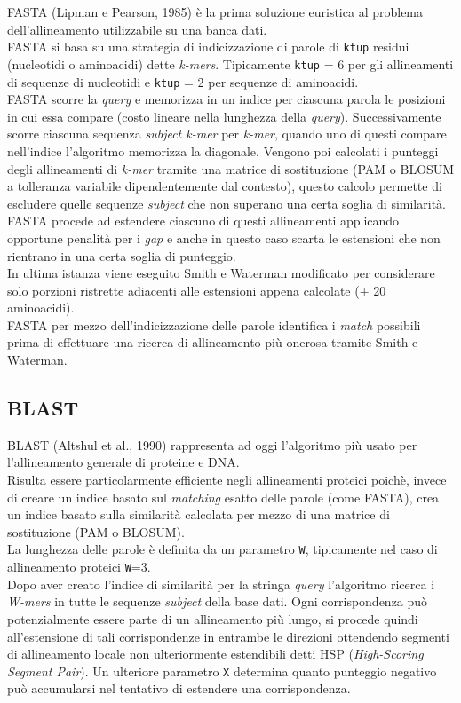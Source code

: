 \documentclass[conference]{IEEEtran}
\begin{document}
FASTA (Lipman e Pearson, 1985) è la prima soluzione euristica al problema dell'allineamento utilizzabile su una banca dati.\\
FASTA si basa su una strategia di indicizzazione di parole di \texttt{ktup} residui (nucleotidi o aminoacidi) dette \textit{k-mers}.
Tipicamente \texttt{ktup} = 6 per gli allineamenti di sequenze di nucleotidi e \texttt{ktup} = 2 per sequenze di aminoacidi.\\
FASTA scorre la \textit{query} e memorizza in un indice per ciascuna parola le posizioni in cui essa compare (costo lineare nella lunghezza della \textit{query}). Successivamente scorre ciascuna sequenza \textit{subject k-mer} per \textit{k-mer}, quando uno di questi compare nell'indice l'algoritmo memorizza la diagonale. Vengono poi calcolati i punteggi degli allineamenti di \textit{k-mer} tramite una matrice di sostituzione (PAM o BLOSUM a tolleranza variabile dipendentemente dal contesto), questo calcolo permette di escludere quelle sequenze \textit{subject} che non superano una certa soglia di similarità.\\
FASTA procede ad estendere ciascuno di questi allineamenti applicando opportune penalità per i \textit{gap} e anche in questo caso scarta le estensioni che non rientrano in una certa soglia di punteggio.\\
In ultima istanza viene eseguito Smith e Waterman modificato per considerare solo porzioni ristrette adiacenti alle estensioni appena calcolate ($\pm$ 20 aminoacidi).\\

FASTA per mezzo dell'indicizzazione delle parole identifica i \textit{match} possibili prima di effettuare una ricerca di allineamento più onerosa tramite Smith e Waterman.

	\subsection{BLAST}
BLAST (Altshul et al., 1990) rappresenta ad oggi l'algoritmo più usato per l'allineamento generale di proteine e DNA.\\
Risulta essere particolarmente efficiente negli allineamenti proteici poichè, invece di creare un indice basato sul \textit{matching} esatto delle parole (come FASTA), crea un indice basato sulla similarità calcolata per mezzo di una matrice di sostituzione (PAM o BLOSUM).\\
La lunghezza delle parole è definita da un parametro \texttt{W}, tipicamente nel caso di allineamento proteici \texttt{W}=3.\\
Dopo aver creato l'indice di similarità per la stringa \textit{query} l'algoritmo ricerca i \textit{W-mers} in tutte le sequenze \textit{subject} della base dati. Ogni corrispondenza può potenzialmente essere parte di un allineamento più lungo, si procede quindi all'estensione di tali corrispondenze in entrambe le direzioni ottendendo segmenti di allineamento locale non ulteriormente estendibili detti HSP (\textit{High-Scoring Segment Pair}). Un ulteriore parametro \texttt{X} determina quanto punteggio negativo può accumularsi nel tentativo di estendere una corrispondenza.\\
\end{document}
